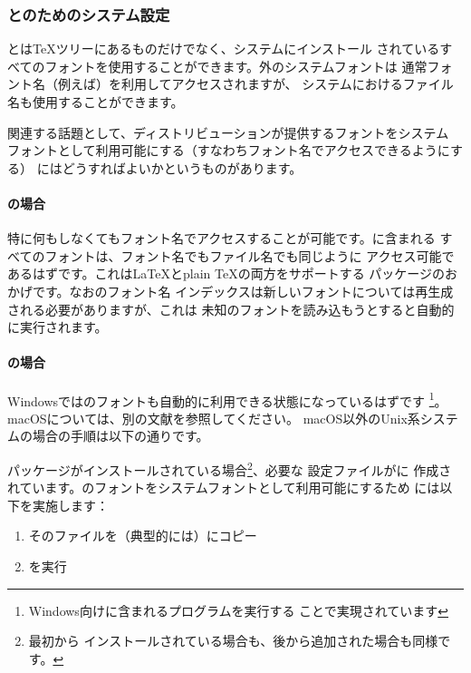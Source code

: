 \documentclass[uplatex,dvipdfmx]{jsarticle}
\begin{document}
\subsubsection{\XeTeX と\LuaTeX のためのシステム設定}
\label{sec:font-conf-sys}

\XeTeX と\LuaTeX は\TeX ツリーにあるものだけでなく、システムにインストール
されているすべてのフォントを使用することができます。\TL 外のシステムフォントは
通常フォント名（例えば）を利用してアクセスされますが、
システムにおけるファイル名も使用することができます。

関連する話題として、\TL ディストリビューションが提供するフォントをシステム
フォントとして利用可能にする（すなわちフォント名でアクセスできるようにする）
にはどうすればよいかというものがあります。

\paragraph{\LuaTeX の場合}
特に何もしなくてもフォント名でアクセスすることが可能です。\TL に含まれる
すべてのフォントは、フォント名でもファイル名でも同じように
アクセス可能であるはずです。これは\LaTeX とplain \TeX の両方をサポートする
パッケージのおかげです。なおのフォント名
インデックスは新しいフォントについては再生成される必要がありますが、これは
未知のフォントを読み込もうとすると自動的に実行されます。

\paragraph{\XeTeX の場合}
Windowsでは\TL のフォントも自動的に利用できる状態になっているはずです
\footnote{Windows向け\TL に含まれるプログラムを実行する
ことで実現されています}。macOSについては、別の文献を参照してください。
macOS以外のUnix系システムの場合の手順は以下の通りです。

パッケージがインストールされている場合\footnote{最初から
インストールされている場合も、後から追加された場合も同様です。}、必要な
設定ファイルがに
作成されています。\TL のフォントをシステムフォントとして利用可能にするため
には以下を実施します：
%
\begin{enumerate}
\item そのファイルを（典型的には）にコピー
\item {}を実行
\end{enumerate}
\end{document}
